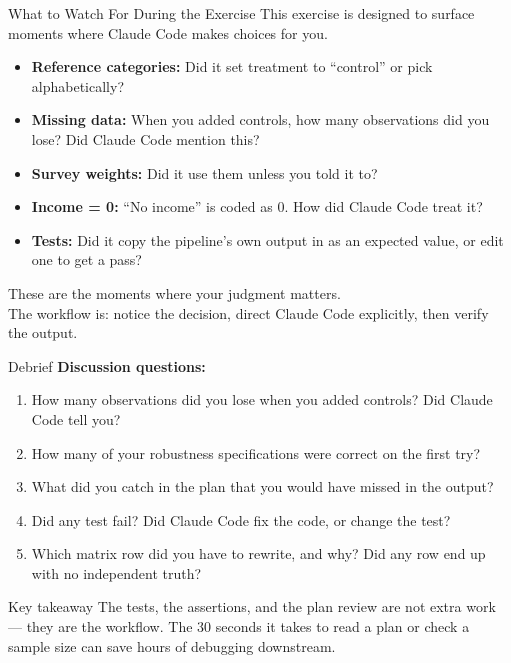 \documentclass[aspectratio=169, 11pt]{beamer}
\begin{document}
\begin{frame}{What to Watch For During the Exercise}
  This exercise is designed to surface moments where Claude Code makes choices for you.

  \vspace{0.5em}
  \begin{itemize}
    \small
    \item \textbf{Reference categories:} Did it set treatment to ``control'' or pick alphabetically?
    \item \textbf{Missing data:} When you added controls, how many observations did you lose? Did Claude Code mention this?
    \item \textbf{Survey weights:} Did it use them unless you told it to?
    \item \textbf{Income = 0:} ``No income'' is coded as 0. How did Claude Code treat it?
    \item \textbf{Tests:} Did it copy the pipeline's own output in as an expected value, or edit one to get a pass?
  \end{itemize}

  \vspace{0.8em}
  \alert{These are the moments where your judgment matters.}\\
  The workflow is: notice the decision, direct Claude Code explicitly, then verify the output.
\end{frame}

\begin{frame}{Debrief}
  \textbf{Discussion questions:}

  \vspace{0.5em}
  \begin{enumerate}
    \small
    \item How many observations did you lose when you added controls? Did Claude Code tell you?
    \item How many of your robustness specifications were correct on the first try?
    \item What did you catch in the plan that you would have missed in the output?
    \item Did any test fail? Did Claude Code fix the code, or change the test?
    \item Which matrix row did you have to rewrite, and why? Did any row end up with no independent truth?
  \end{enumerate}

  \vspace{0.5em}
  \begin{block}{Key takeaway}
    The tests, the assertions, and the plan review are not extra work --- they are the workflow. The 30 seconds it takes to read a plan or check a sample size can save hours of debugging downstream.
  \end{block}
\end{frame}
\end{document}
